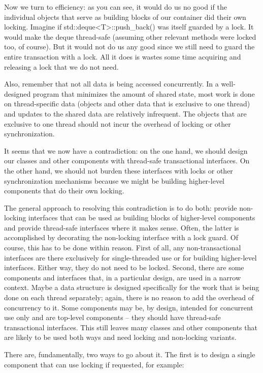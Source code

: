 Now we turn to efficiency: as you can see, it would do us no good if the individual objects that serve as building blocks of our container did their own locking. Imagine if std::deque<T>::push\_back() was itself guarded by a lock. It would make the deque thread-safe (assuming other relevant methods were locked too, of course). But it would not do us any good since we still need to guard the entire transaction with a lock. All it does is wastes some time acquiring and releasing a lock that we do not need.

Also, remember that not all data is being accessed concurrently. In a well-designed program that minimizes the amount of shared state, most work is done on thread-specific data (objects and other data that is exclusive to one thread) and updates to the shared data are relatively infrequent. The objects that are exclusive to one thread should not incur the overhead of locking or other synchronization.

It seems that we now have a contradiction: on the one hand, we should design our classes and other components with thread-safe transactional interfaces. On the other hand, we should not burden these interfaces with locks or other synchronization mechanisms because we might be building higher-level components that do their own locking. 

The general approach to resolving this contradiction is to do both: provide non-locking interfaces that can be used as building blocks of higher-level components and provide thread-safe interfaces where it makes sense. Often, the latter is accomplished by decorating the non-locking interface with a lock guard. Of course, this has to be done within reason. First of all, any non-transactional interfaces are there exclusively for single-threaded use or for building higher-level interfaces. Either way, they do not need to be locked. Second, there are some components and interfaces that, in a particular design, are used in a narrow context. Maybe a data structure is designed specifically for the work that is being done on each thread separately; again, there is no reason to add the overhead of concurrency to it. Some components may be, by design, intended for concurrent use only and are top-level components – they should have thread-safe transactional interfaces. This still leaves many classes and other components that are likely to be used both ways and need locking and non-locking variants. 

There are, fundamentally, two ways to go about it. The first is to design a single component that can use locking if requested, for example:

